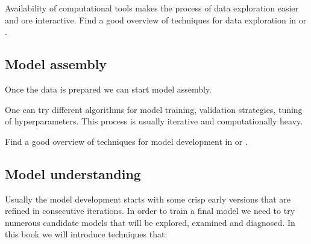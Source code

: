 \documentclass[12pt,]{krantz}
\begin{document}
Availability of computational tools makes the process of data exploration easier and ore interactive. Find a good overview of techniques for data exploration in \citep{Nolan2015} or \citep{Wickham2017}.

\hypertarget{model-assembly}{%
\subsection{Model assembly}\label{model-assembly}}

Once the data is prepared we can start model assembly.

One can try different algorithms for model training, validation strategies, tuning of hyperparameters. This process is usually iterative and computationally heavy.

Find a good overview of techniques for model development in \citep{Venables2010} or \citep{AppliedPredictiveModeling2013}.

\hypertarget{model-understanding}{%
\subsection{Model understanding}\label{model-understanding}}

Usually the model development starts with some crisp early versions that are refined in consecutive iterations. In order to train a final model we need to try numerous candidate models that will be explored, examined and diagnosed. In this book we will introduce techniques that:
\end{document}
